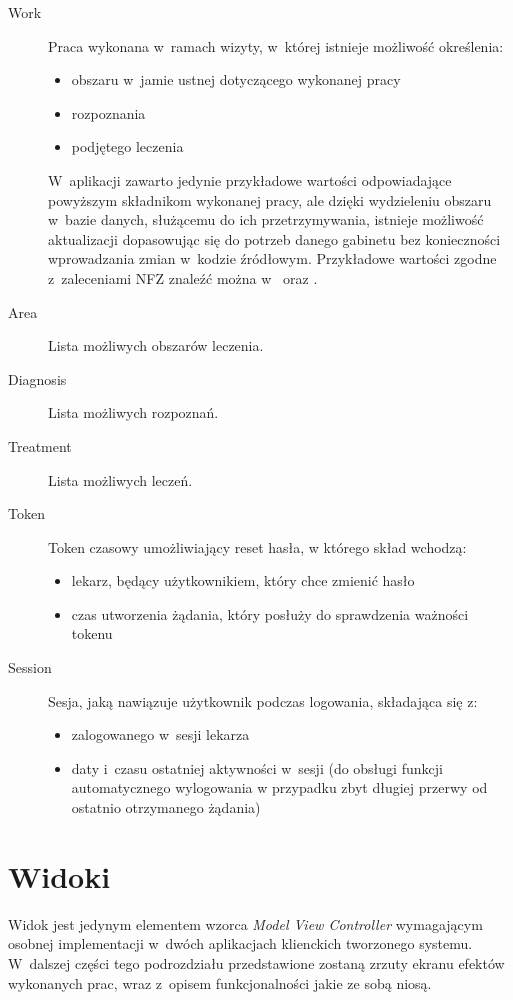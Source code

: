 \documentclass[11pt]{aghdpl}
\begin{document}
\begin{description}
\begin{itemize}
	\end{itemize}
\item[Work]
	Praca wykonana w~ramach wizyty, w~której istnieje możliwość określenia:
	\begin{itemize}
		\item obszaru w~jamie ustnej dotyczącego wykonanej pracy
		\item rozpoznania
		\item podjętego leczenia
	\end{itemize}
	W~aplikacji zawarto jedynie przykładowe wartości odpowiadające powyższym składnikom wykonanej pracy, ale dzięki wydzieleniu obszaru w~bazie danych, służącemu do ich przetrzymywania, istnieje możliwość aktualizacji dopasowując się do potrzeb danego gabinetu bez konieczności wprowadzania zmian w~kodzie źródłowym. Przykładowe wartości zgodne z~zaleceniami NFZ znaleźć można w~\cite{DzU13} oraz \cite{ICD9}.
\item[Area]
	Lista możliwych obszarów leczenia.
\item[Diagnosis]
	Lista możliwych rozpoznań.
\item[Treatment]
	Lista możliwych leczeń.
\item[Token]
	Token czasowy umożliwiający reset hasła, w którego skład wchodzą:
	\begin{itemize}
		\item lekarz, będący użytkownikiem, który chce zmienić hasło
		\item czas utworzenia żądania, który posłuży do sprawdzenia ważności tokenu
	\end{itemize}
\item[Session]
	Sesja, jaką nawiązuje użytkownik podczas logowania, składająca się z:
	\begin{itemize}
		\item zalogowanego w~sesji lekarza
		\item daty i~czasu ostatniej aktywności w~sesji (do obsługi funkcji automatycznego wylogowania w przypadku zbyt długiej przerwy od ostatnio otrzymanego żądania)
	\end{itemize}
\end{description}

\section{Widoki}

Widok jest jedynym elementem wzorca \emph{Model View Controller} wymagającym osobnej implementacji w~dwóch aplikacjach klienckich tworzonego systemu. W~dalszej części tego podrozdziału przedstawione zostaną zrzuty ekranu efektów wykonanych prac, wraz z~opisem funkcjonalności jakie ze sobą niosą.
\end{document}
